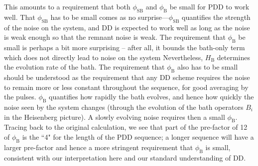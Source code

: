\documentclass[twocolumn,pra,superscriptaddress]{revtex4-2}
\newcommand{\phiSB}{\phi_\mathrm{SB}}
\newcommand{\phiB}{\phi_\mathrm{B}}
\begin{document}
This amounts to a requirement that both $\phiSB$ and $\phiB$ be small for PDD to work well. That $\phiSB$ has to be small comes as no surprise---$\phiSB$ quantifies the strength of the noise on the system, and DD is expected to work well as long as the noise is weak enough so that the remnant noise is weak. The requirement that $\phiB$ be small is perhaps a bit more surprising -- after all, it bounds the bath-only term which does not directly lead to noise on the system Nevertheless, $H_\mathrm{B}$ determines the evolution rate of the bath. The requirement that $\phiB$ also has to be small should be understood as the requirement that any DD scheme requires the noise to remain more or less constant throughout the sequence, for good averaging by the pulses. $\phiB$ quantifies how rapidly the bath evolves, and hence how quickly the noise seen by the system changes (through the evolution of the bath operators $B_i$ in the Heisenberg picture). A slowly evolving noise requires then a small $\phiB$. Tracing back to the original calculation, we see that part of the pre-factor of 12 of $\phiB$ is the ``4" for the length of the PDD sequence; a longer sequence will have a larger pre-factor and hence a more stringent requirement that $\phiB$ is small, consistent with our interpretation here and our standard understanding of DD.
\end{document}
